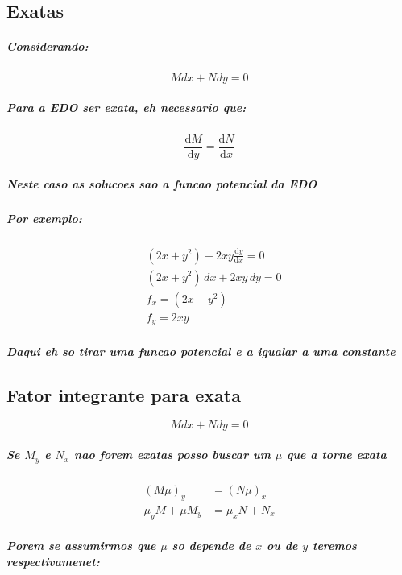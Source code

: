 \documentclass[12pt,twoside, a4paper, twocolumn]{article}
\newcommand\deriv[2]{\frac{\mathrm d #1}{\mathrm d #2}}
\begin{document}
\subsection{Exatas}

\subparagraph*{Considerando:}

\begin{equation}
    M dx + N dy = 0
\end{equation}

\subparagraph*{Para a EDO ser exata, eh necessario que:}

\begin{equation}
    \deriv{M}{y} = \deriv{N}{x}
\end{equation}

\subparagraph*{Neste caso as solucoes sao a funcao potencial da EDO}

\subparagraph*{Por exemplo:}
\begin{equation}
    \begin{aligned}
         & (2x + y^2) + 2xy \deriv{y}{x} = 0 \\
         & (2x + y^2)\,dx + 2xy \,dy = 0     \\
         & f_x = (2x + y^2)                  \\
         & f_y = 2xy
    \end{aligned}
\end{equation}

\subparagraph*{Daqui eh so tirar uma funcao potencial e a igualar a uma constante}

\subsection{Fator integrante para exata}

\begin{equation}
    M dx + N dy = 0
\end{equation}

\subparagraph*{Se $M_y$ e $N_x$ nao forem exatas posso buscar um $\mu$ que a torne exata}

\begin{equation}
    \begin{aligned}
        (M \mu)_y         & = (N \mu)_x     \\
        \mu_y M + \mu M_y & = \mu_x N + N_x
    \end{aligned}
\end{equation}

\subparagraph*{Porem se assumirmos que $\mu$ so depende de $x$ ou de $y$ teremos respectivamenet:}
\end{document}
